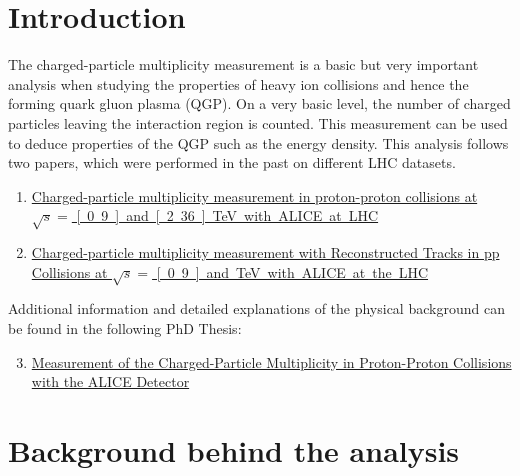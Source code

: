 \documentclass{article}
\begin{document}
\tableofcontents
\newpage


\section{Introduction}
The charged-particle multiplicity measurement is a basic but very important analysis when studying the properties of heavy ion collisions and hence the forming quark gluon plasma (QGP). On a very basic level, the number of charged particles leaving the interaction region is counted. This measurement can be used to deduce properties of the QGP such as the energy density. This analysis follows two papers, which were performed in the past on different LHC datasets.
\begin{enumerate}
\item \label{itm:paper1} \href{http://arxiv.org/abs/1004.3034}{Charged-particle multiplicity measurement in proton-proton collisions at $\sqrt{s} = $ \unit[0.9] and \unit[2.36]{TeV} with ALICE at LHC}
\item \label{itm:paper2} \href{http://cds.cern.ch/record/1562873}{Charged-particle multiplicity measurement with Reconstructed Tracks in pp Collisions at $\sqrt{s} = $ \unit[0.9] and \unit[7]{TeV} with ALICE at the LHC}
\end{enumerate}
Additional information and detailed explanations of the physical background can be found in the following PhD Thesis:
\begin{enumerate}
\setcounter{enumi}{2}
\item \label{itm:thesis} \href{http://cds.cern.ch/record/1175646/}{Measurement of the Charged-Particle Multiplicity in Proton-Proton Collisions with the ALICE Detector}
\end{enumerate}


\section{Background behind the analysis}
\end{document}
